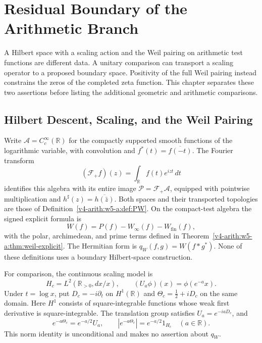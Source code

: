 \chapter{Residual Boundary of the Arithmetic Branch}
\label{v4-arith:w10-final:chapter}

A Hilbert space with a scaling action and the Weil pairing on
arithmetic test functions are different data. A unitary comparison can
transport a scaling operator to a proposed boundary space. Positivity
of the full Weil pairing instead constrains the zeros of the completed
zeta function. This chapter separates these two assertions before
listing the additional geometric and arithmetic comparisons.

\section{Hilbert Descent, Scaling, and the Weil Pairing}
\label{v4-arith:w10-final:w10-a}

Write $\mathscr A=C_c^\infty(\mathbb R)$ for the compactly supported smooth
functions of the logarithmic variable, with convolution and
$f^*(t)=\overline{f(-t)}$. The Fourier transform
\[
 (\mathcal F_+f)(z)=\int_{\mathbb R}f(t)e^{izt}\,dt
\]
identifies this algebra with its entire image
$\mathscr P=\mathcal F_+\mathscr A$, equipped with pointwise
multiplication and $h^\sharp(z)=\overline{h(\bar z)}$.
Both spaces and their transported topologies are those of
Definition~\ref{v4-arith:w5-a:def:PW}. On the compact-test algebra the signed explicit
formula is
\[
 W(f)=P(f)-W_\infty(f)-W_{\mathrm{fin}}(f),
\]
with the polar, archimedean, and prime terms defined in
Theorem~\ref{v4-arith:w5-a:thm:weil-explicit}. The Hermitian form is
$q_W(f,g)=W(f*g^*)$. None of these definitions uses a boundary
Hilbert-space construction.

For comparison, the continuous scaling model is
\[
 H_c=L^2(\mathbb R_{>0},dx/x),\qquad
 (U_a\phi)(x)=\phi(e^{-a}x).
\]
Under $t=\log x$, put $D_c=-i\partial_t$ on
$H^1(\mathbb R)$ and $\Theta_c=\tfrac12+iD_c$ on the same domain.
Here $H^1$ consists of square-integrable functions whose weak first
derivative is square-integrable. The translation group satisfies
$U_a=e^{-iaD_c}$, and
\[
 e^{-a\Theta_c}=e^{-a/2}U_a,\qquad
 |e^{-a\Theta_c}|=e^{-a/2}1_{H_c}\quad(a\in\mathbb R).
\]
This norm identity is unconditional and makes no assertion about
$q_W$.

